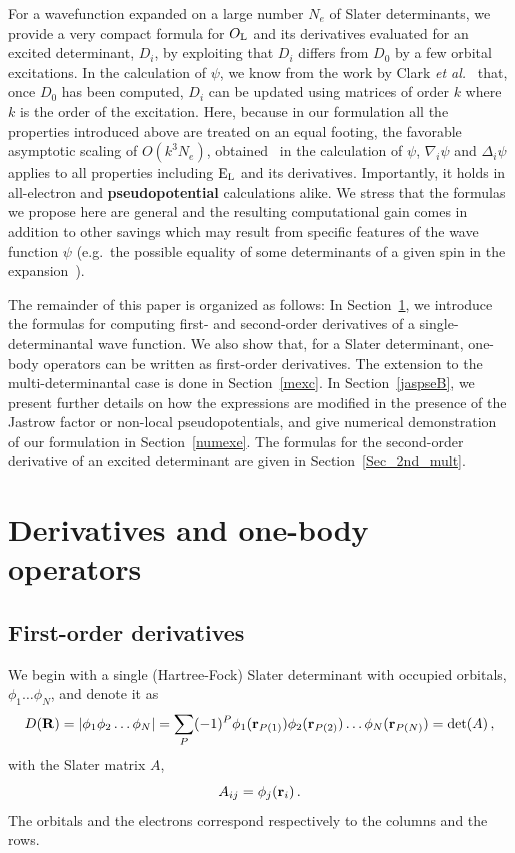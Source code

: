 \documentclass[aip,jcp,reprint,floatfix,onecolumn]{revtex4-1}
\def\det{\text{det}}
\def\wdet{D}
\begin{document}
For a wavefunction expanded on a large number $N_e$ of Slater determinants, we provide a very compact formula for $O_{\rm L}$ and its derivatives evaluated for an excited
determinant, $D_i$, by exploiting that $D_i$ differs from $D_0$ by a few orbital excitations.
In the calculation of $\psi$, we know from the work by Clark {\sl et al.}~\cite{Clark11} that, once $D_0$ has been computed, $D_i$ can be updated using
matrices of order $k$ where $k$ is the order of the excitation.
 Here, because in our formulation all the properties introduced above are treated on an equal footing,  the favorable asymptotic  scaling of $O(k^3 N_e)$,
obtained~\cite{Clark11} in the calculation of $\psi$, $\nabla_i \psi$ and $\Delta_i \psi$
applies to all properties including ${\rm E}_{\rm L}$ and its derivatives.
Importantly, it holds in all-electron and  {\bf pseudopotential} calculations alike.
We stress that the formulas we propose here are general and the resulting computational gain comes in addition to other savings which may result from specific features of
the wave function $\psi$ (e.g.\ the possible equality of some determinants of a given spin in the expansion~\cite{Scemama15}).

The remainder of this paper is organized as follows: In Section~\ref{O_local}, we introduce the formulas for computing first- and
second-order derivatives of a single-determinantal wave function. We also show that, for a Slater determinant, one-body operators can
be written as first-order derivatives.  The extension to the multi-determinantal case is done in Section~\ref{mexc}.
In Section~\ref{jaspseB}, we present further details on how the expressions are modified in the presence of the Jastrow factor
or non-local pseudopotentials, and give numerical demonstration of our formulation in Section~\ref{numexe}.
The formulas for the second-order derivative of an excited determinant are given in Section~\ref{Sec_2nd_mult}.

\section{Derivatives and one-body operators}
\label{O_local}

\subsection{First-order derivatives}

We begin with a single (Hartree-Fock) Slater determinant
with occupied orbitals, $\phi_1 \dots \phi_N$, and denote it as
\begin{equation}
\wdet({\bf R}) =  |\phi_1   \phi_2  \dots  \phi_N| = \sum_P  (-1)^P \phi_{1}({\bf r}_{P(1)})  \phi_{2}({\bf r}_{P(2)}) \dots \phi_N ({\bf r}_{P(N)}) =
\det (A)\,,
\end{equation}
with the Slater matrix $A$,
\begin{equation}
A_{ij} = \phi_j ({\bf r}_i)\,.
\end{equation}
The orbitals and the electrons correspond respectively to the columns and the rows.
\end{document}
